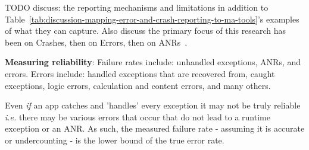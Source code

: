 
\begin{table}[]
    \centering
    \caption{w-i-p: Mapping error and crash reporting to mobile analytics tools \\ E = Error, C = Crash, B = Breadcrumb, K = Custom content, N = No}
    \label{tab:discussion-mapping-error-and-crash-reporting-to-ma-tools}
\end{table}
\afterpage{\clearpage}

TODO discuss: the reporting mechanisms and limitations in addition to Table~\ref{tab:discussion-mapping-error-and-crash-reporting-to-ma-tools}'s examples of what they can capture. Also discuss the primary focus of this research has been on Crashes, then on Errors, then on ANRs~.

\textbf{Measuring reliability}: 
Failure rates include: unhandled exceptions, ANRs, and errors. Errors include: handled exceptions that are recovered from, caught exceptions, logic errors, calculation and content errors, and many others. 

Even \textit{if} an app catches and 'handles' every exception it may not be truly reliable \textit{i.e.} there may be various errors that occur that do not lead to a runtime exception or an ANR. As such, the measured failure rate - assuming it is accurate or undercounting - is the lower bound of the true error rate.


